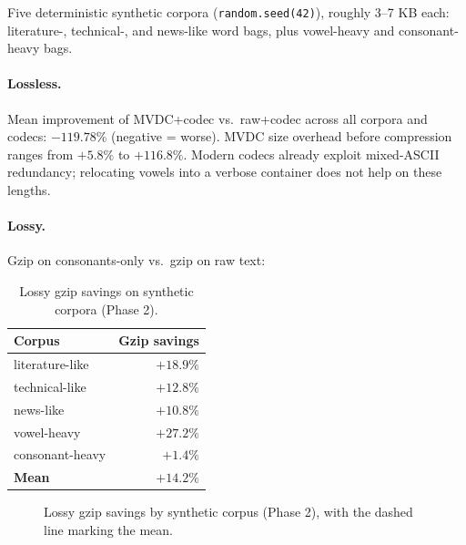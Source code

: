 \documentclass{article}
\begin{document}
Five deterministic synthetic corpora (\texttt{random.seed(42)}), roughly 3--7 KB each: literature-, technical-, and news-like word bags, plus vowel-heavy and consonant-heavy bags.

\paragraph{Lossless.} Mean improvement of MVDC+codec vs.\ raw+codec across all corpora and codecs: $\mathbf{-119.78\%}$ (negative = worse). MVDC size overhead before compression ranges from $+5.8\%$ to $+116.8\%$. Modern codecs already exploit mixed-ASCII redundancy; relocating vowels into a verbose container does not help on these lengths.

\paragraph{Lossy.} Gzip on consonants-only vs.\ gzip on raw text:

\begin{table}[h]
	\caption{Lossy gzip savings on synthetic corpora (Phase 2).}
	\centering
	\begin{tabular}{lr}
		\toprule
		Corpus            & Gzip savings   \\
		\midrule
		literature-like   & $+18.9\%$      \\
		technical-like    & $+12.8\%$      \\
		news-like         & $+10.8\%$      \\
		vowel-heavy       & $+27.2\%$      \\
		consonant-heavy   & $+1.4\%$       \\
		\midrule
		\textbf{Mean}     & $\mathbf{+14.2\%}$ \\
		\bottomrule
	\end{tabular}
	\label{tab:phase2-lossy}
\end{table}

\begin{figure}[ht]
	\centering
	\caption{Lossy gzip savings by synthetic corpus (Phase 2), with the dashed line marking the mean.}
	\label{fig:phase2-bar}
\end{figure}
\end{document}
